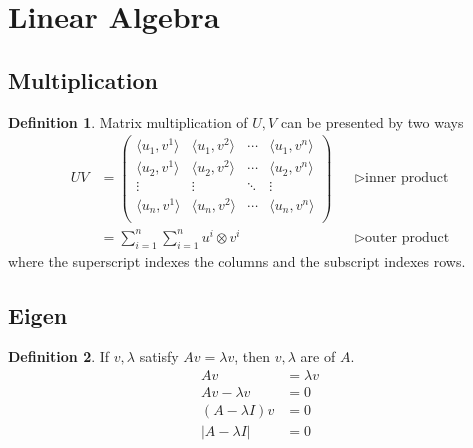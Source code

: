 \documentclass[a4paper]{article}
\theoremstyle{definition}
\newtheorem{definition}{Definition}
\theoremstyle{plain}
\begin{document}
\section{Linear Algebra}
\subsection{Multiplication}
\begin{definition}
Matrix multiplication of $U,V$ can be presented by two ways
\begin{align*}UV&=
    \begin{pmatrix}
        \langle u_1,v^1\rangle & \langle u_1,v^2\rangle & \cdots &\langle u_1,v^n\rangle \\
        \langle u_2,v^1\rangle & \langle u_2,v^2\rangle & \cdots &\langle u_2,v^n\rangle \\
        \vdots & \vdots & \ddots &\vdots \\
        \langle u_n,v^1\rangle & \langle u_n,v^2\rangle & \cdots &\langle u_n,v^n\rangle \\
    \end{pmatrix}&&\triangleright\text{inner product}\\
    &=\sum^n_{i=1}\sum^n_{i=1}u^i\otimes v^i&&\triangleright\text{outer product}
\end{align*}
where the superscript indexes the columns and the subscript indexes rows.
\end{definition}
\subsection{Eigen}
\begin{definition}
If $v,\lambda$ satisfy $Av=\lambda v$, then $v,\lambda$ are  of $A$.
\begin{align*}
    Av&=\lambda v\\
    Av-\lambda v&=0\\
    (A-\lambda I)v&=0\\
    |A-\lambda I|&=0
\end{align*}
\end{definition}
\end{document}
